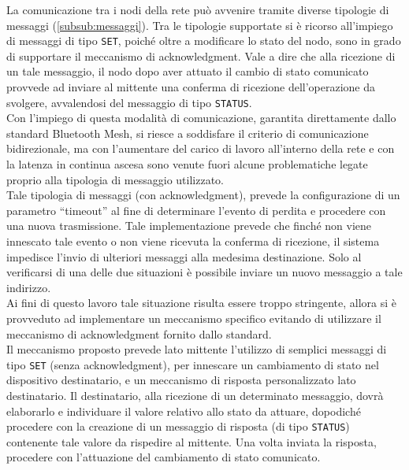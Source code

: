 \noindent La comunicazione tra i nodi della rete può avvenire tramite diverse tipologie di messaggi (\ref{subsub:messaggi}). Tra le tipologie supportate si è ricorso all'impiego di messaggi di tipo \texttt{SET}, poiché oltre a modificare lo stato del nodo, sono in grado di supportare il meccanismo di acknowledgment. Vale a dire che alla ricezione di un tale messaggio, il nodo dopo aver attuato il cambio di stato comunicato provvede ad inviare al mittente una conferma di ricezione dell'operazione da svolgere, avvalendosi del messaggio di tipo \texttt{STATUS}.\\

\noindent Con l'impiego di questa modalità di comunicazione, garantita direttamente dallo standard Bluetooth Mesh, si riesce a soddisfare il criterio di comunicazione bidirezionale, ma con l'aumentare del carico di lavoro all'interno della rete e con la latenza in continua ascesa sono venute fuori alcune problematiche legate proprio alla tipologia di messaggio utilizzato. \\ %
Tale tipologia di messaggi (con acknowledgment), prevede la configurazione di un parametro ``timeout'' al fine di determinare l'evento di perdita e procedere con una nuova trasmissione. Tale implementazione prevede che finché non viene innescato tale evento o non viene ricevuta la conferma di ricezione, il sistema impedisce l'invio di ulteriori messaggi alla medesima destinazione. Solo al verificarsi di una delle due situazioni è possibile inviare un nuovo messaggio a tale indirizzo. \\
Ai fini di questo lavoro tale situazione risulta essere troppo stringente, allora si è provveduto ad implementare un meccanismo specifico evitando di utilizzare il meccanismo di acknowledgment fornito dallo standard.\\ 
Il meccanismo proposto prevede lato mittente l'utilizzo di semplici messaggi di tipo \texttt{SET} (senza acknowledgment), per innescare un cambiamento di stato nel dispositivo destinatario, e un meccanismo di risposta personalizzato lato destinatario. Il destinatario, alla ricezione di un determinato messaggio, dovrà elaborarlo e individuare il valore relativo allo stato da attuare, dopodiché procedere con la creazione di un messaggio di risposta (di tipo \texttt{STATUS}) contenente tale valore da rispedire al mittente. Una volta inviata la risposta, procedere con l'attuazione del cambiamento di stato comunicato.\\ %

